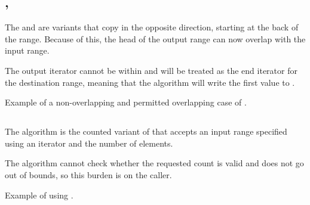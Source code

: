 \subsection{\texorpdfstring{, }{\texttt{std::copy\_backward}, \texttt{std::move\_backward}}}

The  and  are variants that copy in the opposite direction, starting at the back of the range. Because of this, the head of the output range can now overlap with the input range.



The output iterator cannot be within \cpp{(first, last]} and will be treated as the end iterator for the destination range, meaning that the algorithm will write the first value to .

\begin{box-note}
\footnotesize Example of a non-overlapping and permitted overlapping case of .
\tcblower
{}
\end{box-note}

\subsection{\texorpdfstring{}{\texttt{std::copy\_n}}}

The  algorithm is the counted variant of  that accepts an input range specified using an iterator and the number of elements.


The algorithm cannot check whether the requested count is valid and does not go out of bounds, so this burden is on the caller.

\begin{box-note}
\footnotesize Example of using .
\tcblower
{}
\end{box-note}

